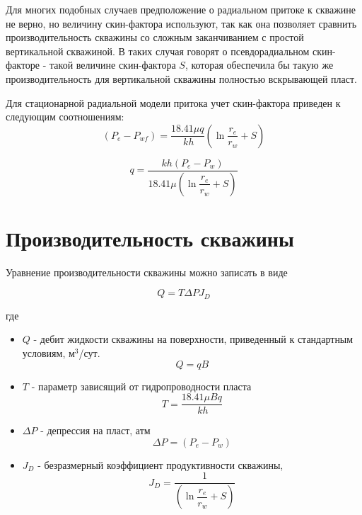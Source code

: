Для многих подобных случаев предположение о радиальном притоке к скважине не верно, но величину скин-фактора используют, так как она позволяет сравнить производительность скважины со сложным заканчиванием с простой вертикальной скважиной. В таких случая говорят о псевдорадиальном скин-факторе - такой величине скин-фактора $S$, которая обеспечила бы такую же производительность для вертикальной скважины полностью вскрывающей пласт. 

Для стационарной радиальной модели притока учет скин-фактора приведен к следующим соотношениям:
\begin{equation} \label{eq:dupui_skin_1}
(P_e - P_{wf}) = \frac{18.41\mu q }{\ k h}(\ln\frac{r_e}{r_w}+S) 
\end{equation}


\begin{equation} \label{eq:dupui_skin_2}
q=\frac{kh\left(P_e-P_w\right)}{ 18.41 \mu\left(\ln{\dfrac{r_e}{r_w}} + S\right)}
\end{equation}

\section{Производительность скважины}

Уравнение производительности скважины можно записать в виде

\begin{equation} \label{eq:well_productivity}
Q = T \Delta P J_D
\end{equation}

где
\begin{itemize}
	\item $Q$ - дебит жидкости скважины на поверхности, приведенный к стандартным условиям, м$^3$/сут. $$Q = qB$$

	\item $T$ - параметр зависящий от гидропроводности пласта 
	\begin{equation} \label{eq:T}
		T=\dfrac{18.41\mu B q }{\ k h}
	\end{equation}
	
	\item $\Delta P$ - депрессия на пласт, атм 
	\begin{equation} \label{eq:dP}
		\Delta P = \left(P_e-P_w\right)
	\end{equation}
	
	
	\item $J_D$ - безразмерный коэффициент продуктивности скважины, 
	\begin{equation} \label{eq:JD}
		J_D = \dfrac{1}{ \left(\ln{\dfrac{r_e}{r_w}} + S\right)}
	\end{equation}
	

\end{itemize}

